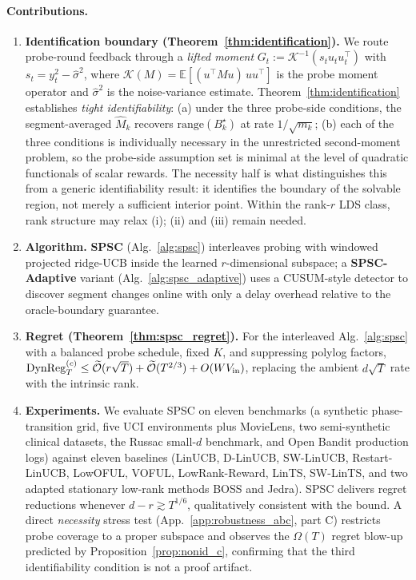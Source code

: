 \documentclass{article}
\newcommand{\E}{\mathbb{E}}
\newcommand{\tilO}{\widetilde{\mathcal{O}}}
\newcommand{\DynReg}{\mathrm{DynReg}}
\newcommand{\range}{\mathrm{range}}
\begin{document}
\paragraph{Contributions.}
\begin{enumerate}[leftmargin=1.5em,itemsep=2pt]
\item \textbf{Identification boundary (Theorem~\ref{thm:identification}).}
We route probe-round feedback through a \emph{lifted moment}
$G_t := \mathcal K^{-1}(s_t u_t u_t^\top)$ with
$s_t = y_t^2 - \widehat\sigma^2$, where $\mathcal K(M)=\E[(u^\top Mu)\,uu^\top]$
is the probe moment operator and $\widehat\sigma^2$ is the
noise-variance estimate. Theorem~\ref{thm:identification} establishes
\emph{tight identifiability}: (a) under the three probe-side
conditions, the segment-averaged $\widehat M_k$ recovers
$\range(B_k^\star)$ at rate $1/\sqrt{m_k}$; (b) each of the three
conditions is individually necessary in the unrestricted
second-moment problem, so the probe-side assumption set is minimal
at the level of quadratic functionals of scalar rewards. The
necessity half is what distinguishes this from a generic
identifiability result: it identifies the boundary of the solvable
region, not merely a sufficient interior point. Within the rank-$r$
LDS class, rank structure may relax (i); (ii) and (iii) remain
needed.
\item \textbf{Algorithm.} \textbf{SPSC} (Alg.~\ref{alg:spsc})
interleaves probing with windowed projected ridge-UCB inside the
learned $r$-dimensional subspace; a \textbf{SPSC-Adaptive} variant
(Alg.~\ref{alg:spsc_adaptive}) uses a CUSUM-style detector to
discover segment changes online with only a delay overhead relative
to the oracle-boundary guarantee.
\item \textbf{Regret (Theorem~\ref{thm:spsc_regret}).} For the
interleaved Alg.~\ref{alg:spsc} with a balanced probe schedule,
fixed $K$, and suppressing polylog factors,
$\DynReg_T^{(c)}\le\tilO(r\sqrt{T})+\tilO(T^{2/3})+O(WV_{\rm in})$,
replacing the ambient $d\sqrt{T}$ rate with the intrinsic rank.
\item \textbf{Experiments.} We evaluate SPSC on eleven benchmarks (a
synthetic phase-transition grid, five UCI environments plus MovieLens,
two semi-synthetic clinical datasets, the Russac small-$d$ benchmark,
and Open Bandit production logs) against eleven baselines (LinUCB,
D-LinUCB, SW-LinUCB, Restart-LinUCB, LowOFUL, VOFUL, LowRank-Reward,
LinTS, SW-LinTS, and two adapted stationary low-rank methods BOSS
and Jedra). SPSC delivers regret reductions whenever
$d-r\gtrsim T^{1/6}$, qualitatively consistent with the bound. A
direct \emph{necessity} stress test (App.~\ref{app:robustness_abc}, part C)
restricts probe coverage to a proper subspace and observes the
$\Omega(T)$ regret blow-up predicted by
Proposition~\ref{prop:nonid_c}, confirming that the third
identifiability condition is not a proof artifact.
\end{enumerate}
\end{document}
